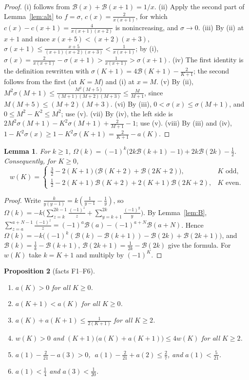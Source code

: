 \documentclass[11pt]{amsart}
\newtheorem{lemma}{Lemma}[section]
\newtheorem{proposition}[lemma]{Proposition}
\theoremstyle{definition}
\theoremstyle{remark}
\numberwithin{equation}{section}
\newcommand{\cB}{\mathcal{B}}
\begin{document}
\begin{proof}
(i) follows from $\cB(x)+\cB(x+1)=1/x$. (ii) Apply the second part of Lemma~\ref{lem:alt} to
$f=\sigma$, $c(x)=\frac2{x(x+1)}$, for which $c(x)-c(x+1)=\frac4{x(x+1)(x+2)}$ is nonincreasing, and
$\sigma\to0$. (iii) By (ii) at $x+1$ and since $x(x+5)<(x+2)(x+3)$,
$\sigma(x+1)\le\frac{x+5}{(x+1)(x+2)(x+3)}<\frac1{x(x+1)}$; by (i),
$\sigma(x)=\frac2{x(x+1)}-\sigma(x+1)>\frac1{x(x+1)}>\sigma(x+1)$. (iv) The first identity is the
definition rewritten with $\sigma(K+1)=4\cB(K+1)-\frac2{K+1}$; the second follows from the first (at $K=M$)
and (i) at $x=M$. (v) By (ii),
$M^2\sigma(M+1)\le\frac{M^2(M+5)}{(M+1)(M+2)(M+3)}\le\frac M{M+1}$, since $M(M+5)\le(M+2)(M+3)$.
(vi) By (iii), $0<\sigma(x)\le\sigma(M+1)$, and $0\le M^2-K^2\le M^2$; use (v). (vii) By (iv),
the left side is $2M^2\sigma(M+1)-K^2\sigma(M+1)+\frac2{M+1}-1$; use (v). (viii) By (iii) and (iv),
$1-K^2\sigma(x)\ge1-K^2\sigma(K+1)=\frac2{K+1}-a(K)$.
\end{proof}

\begin{lemma}\label{lem:omega}
For $k\ge1$, $\Omega(k)=(-1)^k\bigl(2k\cB(k+1)-1\bigr)+2k\cB(2k)-\frac12$. Consequently, for $K\ge0$,
\[
  w(K)=\begin{cases}
  \tfrac32-2(K+1)\bigl(\cB(K+2)+\cB(2K+2)\bigr), & K\text{ odd},\\[2pt]
  \tfrac12-2(K+1)\cB(K+2)+2(K+1)\cB(2K+2), & K\text{ even}.
  \end{cases}
\]
\end{lemma}

\begin{proof}
Write $\frac k{y(y-1)}=k(\frac1{y-1}-\frac1y)$, so
$\Omega(k)=-k\bigl(\sum_{z=k}^{2k-1}\frac{(-1)^z}z+\sum_{y=k+1}^{2k}\frac{(-1)^y}y\bigr)$. By
Lemma~\ref{lem:B}, $\sum_{z=a}^{a+N-1}\frac{(-1)^z}{z}=(-1)^a\cB(a)-(-1)^{a+N}\cB(a+N)$. Hence
$\Omega(k)=-k\bigl((-1)^k(\cB(k)-\cB(k+1))-\cB(2k)+\cB(2k+1)\bigr)$, and $\cB(k)=\frac1k-\cB(k+1)$,
$\cB(2k+1)=\frac1{2k}-\cB(2k)$ give the formula. For $w(K)$ take $k=K+1$ and multiply by $(-1)^K$.
\end{proof}

\begin{proposition}[facts F1--F6]\label{prop:facts}
\begin{enumerate}
\item[F1] $a(K)>0$ for all $K\ge0$.
\item[F2] $a(K+1)<a(K)$ for all $K\ge0$.
\item[F3] $a(K)+a(K+1)\le\frac1{2(K+1)}$ for all $K\ge2$.
\item[F4] $w(K)>0$ and $(K+1)\bigl(a(K)+a(K+1)\bigr)\le4w(K)$ for all $K\ge2$.
\item[F5] $a(1)-\frac2{21}-a(3)>0$, $\;a(1)-\frac2{21}+a(2)\le\frac27$, and $a(1)<\frac5{21}$.
\item[F6] $a(1)<\frac14$ and $a(3)<\frac1{20}$.
\end{enumerate}
\end{proposition}
\end{document}
